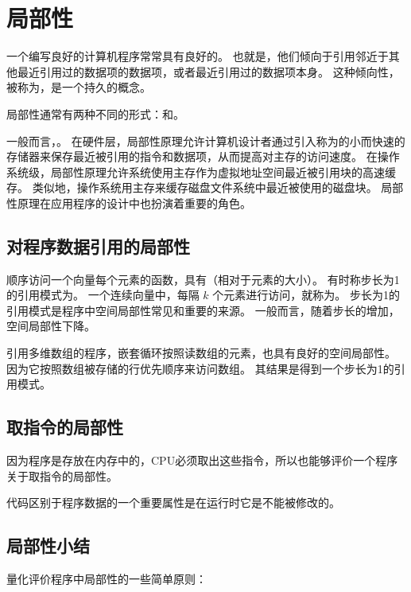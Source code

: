 
\section{局部性}
{
    一个编写良好的计算机程序常常具有良好的。
    也就是，他们倾向于引用邻近于其他最近引用过的数据项的数据项，或者最近引用过的数据项本身。
    这种倾向性，被称为，是一个持久的概念。

    局部性通常有两种不同的形式：和。

    一般而言，。
    在硬件层，局部性原理允许计算机设计者通过引入称为的小而快速的存储器来保存最近被引用的指令和数据项，从而提高对主存的访问速度。
    在操作系统级，局部性原理允许系统使用主存作为虚拟地址空间最近被引用块的高速缓存。
    类似地，操作系统用主存来缓存磁盘文件系统中最近被使用的磁盘块。
    局部性原理在应用程序的设计中也扮演着重要的角色。

    \subsection{对程序数据引用的局部性}
    {
        顺序访问一个向量每个元素的函数，具有（相对于元素的大小）。
        有时称步长为1的引用模式为。
        一个连续向量中，每隔 $k$ 个元素进行访问，就称为。
        步长为1的引用模式是程序中空间局部性常见和重要的来源。
        一般而言，随着步长的增加，空间局部性下降。

        引用多维数组的程序，嵌套循环按照读数组的元素，也具有良好的空间局部性。
        因为它按照数组被存储的行优先顺序来访问数组。
        其结果是得到一个步长为1的引用模式。
    }

    \subsection{取指令的局部性}
    {
        因为程序是存放在内存中的，CPU必须取出这些指令，所以也能够评价一个程序关于取指令的局部性。

        代码区别于程序数据的一个重要属性是在运行时它是不能被修改的。
    }

    \subsection{局部性小结}
    {
        量化评价程序中局部性的一些简单原则：

}}
